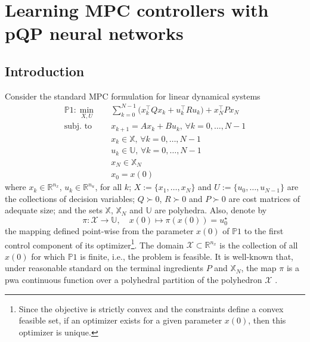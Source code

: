 \cleardoublepage
\chapter{Learning MPC controllers with pQP neural networks}

\section{Introduction}
\label{sec.chap4_intro}

Consider the standard MPC formulation for linear dynamical systems
\begin{subequations}
	\label{eq:linearmpc}
	\begin{align}
		\mathds{P}1: \min_{X,U} \quad & \sum_{k=0}^{N-1} \big( x_k^\top Q x_k + u_k^\top R u_k \big) + x_N^\top P x_N \label{eq.MPC_classical_cost}\\
		\text{subj. to} \quad 
		& x_{k+1} = A x_{k} + B u_{k}, \, \forall k = 0,\dots,N-1  \\
		& x_{k} \in \mathbb{X}, \, \forall k = 0,\dots,N-1 \\
		& u_{k} \in \mathbb{U}, \, \forall k = 0,\dots,N-1 \\
		& x_{N} \in \mathbb{X}_N \\
		& x_0 = x(0)
	\end{align}
\end{subequations}
where $x_k \in \mathbb{R}^{n_x}$, $u_k \in \mathbb{R}^{n_u}$, for all $k$; $X:=\{x_1,\dots,x_{N}\}$ and $U:=\{u_0,\dots,u_{N-1}\}$ are the collections of decision variables; $Q \succ 0$, $R \succ 0$ and $P \succ 0$ are cost matrices of adequate size; and the sets $\mathbb{X}$, $\mathbb{X}_N$ and $\mathbb{U}$ are polyhedra. Also, denote by 
\begin{equation}
	\pi: \mathcal{X} \rightarrow \mathbb{U}, \quad x(0) \mapsto \pi(x(0)) = u_0^\star
\end{equation} 
the mapping defined point-wise from the parameter $x(0)$ of $\mathds{P}1$ to the first control component of its optimizer\footnote{Since the objective is strictly convex and the constraints define a convex feasible set, if an optimizer exists for a given parameter $x(0)$, then this optimizer is unique.}. The domain $\mathcal{X} \subset \mathbb{R}^{n_x}$ is the collection of all $x(0)$ for which $\mathds{P}1$ is finite, i.e., the problem is feasible. It is well-known that, under reasonable standard on the terminal ingredients $P$ and $\mathbb{X}_N$, the map $\pi$ is a \ac{pwa} continuous function over a polyhedral partition of the polyhedron $\mathcal{X}$ \citep{bemporad2002explicit,borrelli2017predictive}. 

